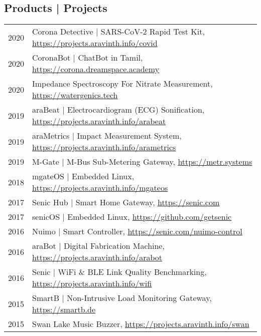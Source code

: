 \subsection{Products | Projects}
\begin{longtable}
	{r|p{13cm}}
	\textsc{2020} & Corona Detective | SARS-CoV-2 Rapid Test Kit, \href{https://projects.aravinth.info/covid}{https://projects.aravinth.info/covid}\\
	\textsc{2020} & CoronaBot | ChatBot in Tamil, \href{https://corona.dreamspace.academy}{https://corona.dreamspace.academy}\\
	\textsc{2020} & Impedance Spectroscopy For Nitrate Measurement, \href{https://watergenics.tech}{https://watergenics.tech}\\
	\textsc{2019} & araBeat | Electrocardiogram (ECG) Sonification, \href{https://projects.aravinth.info/arabeat}{https://projects.aravinth.info/arabeat}\\
	\textsc{2019} & araMetrics | Impact Measurement System, \href{https://projects.aravinth.info/arametrics}{https://projects.aravinth.info/arametrics}\\
	\textsc{2019} & M-Gate | M-Bus Sub-Metering Gateway, \href{https://metr.systems}{https://metr.systems}\\
	\textsc{2018} & mgateOS | Embedded Linux, \href{https://projects.aravinth.info/mgateos}{https://projects.aravinth.info/mgateos}\\
	\textsc{2017} & Senic Hub | Smart Home Gateway, \href{https://senic.com}{https://senic.com}\\
	\textsc{2017} & senicOS | Embedded Linux, \href{https://github.com/getsenic}{https://github.com/getsenic}\\
	\textsc{2016} & Nuimo | Smart Controller, \href{https://senic.com/nuimo-control}{https://senic.com/nuimo-control}\\
	\textsc{2016} & araBot | Digital Fabrication Machine, \href{https://projects.aravinth.info/arabot}{https://projects.aravinth.info/arabot}\\
	\textsc{2016} & Senic | WiFi \& BLE Link Quality Benchmarking, \href{https://projects.aravinth.info/wifi}{https://projects.aravinth.info/wifi}\\
	\textsc{2015} & SmartB | Non-Intrusive Load Monitoring Gateway, \href{https://smartb.de}{https://smartb.de}\\
	\textsc{2015} & Swan Lake Music Buzzer, \href{https://projects.aravinth.info/swan}{https://projects.aravinth.info/swan}\\

\end{longtable}

